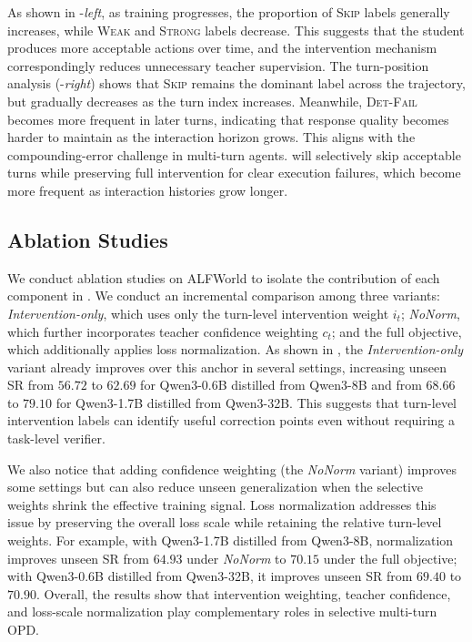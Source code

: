 As shown in -\textit{left}, as training progresses, the proportion of \textsc{Skip} labels generally increases, while \textsc{Weak} and \textsc{Strong} labels decrease. 
%
This suggests that the student produces more acceptable actions over time, and the intervention mechanism correspondingly reduces unnecessary teacher supervision. 
%
The turn-position analysis (-\textit{right}) shows that \textsc{Skip} remains the dominant label across the trajectory, but gradually decreases as the turn index increases. 
%
Meanwhile, \textsc{Det-Fail} becomes more frequent in later turns, indicating that response quality becomes harder to maintain as the interaction horizon grows. 
%
This aligns with the compounding-error challenge in multi-turn agents. \ours will selectively skip acceptable turns while preserving full intervention for clear execution failures, which become more frequent as interaction histories grow longer.





\subsection{Ablation Studies}

We conduct ablation studies on ALFWorld to isolate the contribution of each component in \ours.
%
We conduct an incremental comparison among three variants: \textit{Intervention-only}, which uses only the turn-level intervention weight $i_t$; \textit{NoNorm}, which further incorporates teacher confidence weighting $c_t$; and the full \ours objective, which additionally applies loss normalization.
%
As shown in , the \textit{Intervention-only} variant already improves over this anchor in several settings, increasing unseen SR from $56.72$ to $62.69$ for Qwen3-0.6B distilled from Qwen3-8B and from $68.66$ to $79.10$ for Qwen3-1.7B distilled from Qwen3-32B.
%
This suggests that turn-level intervention labels can identify useful correction points even without requiring a task-level verifier.
%

We also notice that adding confidence weighting (the \textit{NoNorm} variant) improves some settings but can also reduce unseen generalization when the selective weights shrink the effective training signal.
%
Loss normalization addresses this issue by preserving the overall loss scale while retaining the relative turn-level weights.
%
For example, with Qwen3-1.7B distilled from Qwen3-8B, normalization improves unseen SR from $64.93$ under \textit{NoNorm} to $70.15$ under the full \ours objective; with Qwen3-0.6B distilled from Qwen3-32B, it improves unseen SR from $69.40$ to $70.90$.
%
Overall, the results show that intervention weighting, teacher confidence, and loss-scale normalization play complementary roles in selective multi-turn OPD.
%


